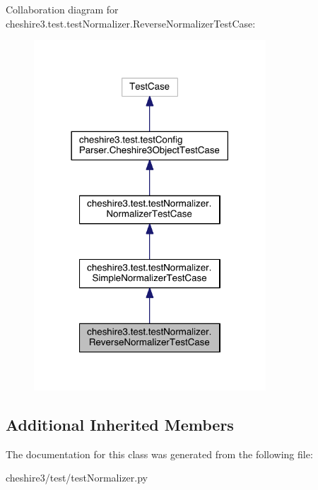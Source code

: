 Collaboration diagram for cheshire3.\-test.\-test\-Normalizer.\-Reverse\-Normalizer\-Test\-Case\-:
\nopagebreak
\begin{figure}[H]
\begin{center}
\leavevmode
\includegraphics[width=246pt]{classcheshire3_1_1test_1_1test_normalizer_1_1_reverse_normalizer_test_case__coll__graph}
\end{center}
\end{figure}
\subsection*{Additional Inherited Members}


The documentation for this class was generated from the following file\-:\begin{DoxyCompactItemize}
\item 
cheshire3/test/test\-Normalizer.\-py\end{DoxyCompactItemize}

